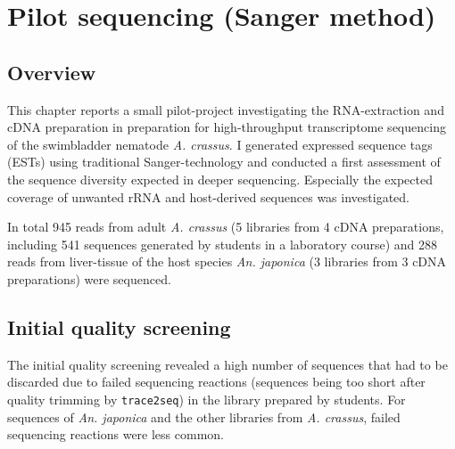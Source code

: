 
\chapter{Pilot sequencing (Sanger method)} %
\label{pilot-seq}


\ifpdf
    \graphicspath{{3_pilot/figures/PNG/}{3_pilot/figures/PDF/}{3_pilot/figures/}}
\else
    \graphicspath{{3_pilot/figures/EPS/}{3_pilot/figures/}}
\fi


\section{Overview}

This chapter reports a small pilot-project investigating the
RNA-extraction and cDNA preparation in preparation for high-throughput
transcriptome sequencing of the swimbladder nematode
\textit{A. crassus}. I generated expressed sequence tags (ESTs) using
traditional Sanger-technology and conducted a first assessment of the
sequence diversity expected in deeper sequencing. Especially the
expected coverage of unwanted rRNA and host-derived sequences was
investigated.

In total 945 reads from adult \textit{A. crassus} (5 libraries from 4
cDNA preparations, including 541 sequences generated by students in a
laboratory course) and 288 reads from liver-tissue of the host species
\textit{An. japonica} (3 libraries from 3 cDNA preparations) were
sequenced.

\section{Initial quality screening}
\label{qual-pil}

The initial quality screening revealed a high number of sequences that
had to be discarded due to failed sequencing reactions (sequences
being too short after quality trimming by \texttt{trace2seq}) in the
library prepared by students. For sequences of \textit{An. japonica}
and the other libraries from \textit{A. crassus}, failed sequencing
reactions were less common.

